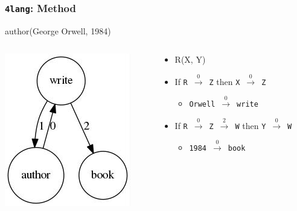 \documentclass[bigger]{beamer}
\newcommand{\fl}{\texttt{4lang}\xspace}
\begin{document}
\begin{frame}
    \frametitle{\fl: Method}
    \centering
    \pause author(George Orwell, 1984)
    \begin{columns}
        \begin{column}{0.4\textwidth}
            \pause \includegraphics[scale=0.6]{pics/author.jpg}
        \end{column}
        \begin{column}{0.6\textwidth}
            \begin{itemize}
                \pause \item R(X, Y)
                \pause \item If \texttt{R}~$\xrightarrow0$~\texttt{Z} then \texttt{X}~$\xrightarrow0$~\texttt{Z}
                \begin{itemize}
                    \pause \item \texttt{Orwell}~$\xrightarrow0$~\texttt{write}
                \end{itemize}
                \pause \item If \texttt{R}~$\xrightarrow0$~\texttt{Z}~$\xrightarrow2$~\texttt{W} then \texttt{Y}~$\xrightarrow0$~\texttt{W}
                    \begin{itemize}
                        \pause \item \texttt{1984}~$\xrightarrow0$~\texttt{book}
                    \end{itemize}
            \end{itemize}
        \end{column}
    \end{columns}
\end{frame}
\end{document}
